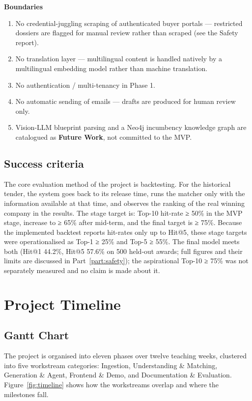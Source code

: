 \textbf{Boundaries}

\begin{enumerate}
\tightlist
\item No credential-juggling scraping of authenticated buyer portals --- restricted
  dossiers are flagged for manual review rather than scraped (see the Safety report).
\item No translation layer --- multilingual content is handled natively by a
  multilingual embedding model rather than machine translation.
\item No authentication / multi-tenancy in Phase 1.
\item No automatic sending of emails --- drafts are produced for human review only.
\item Vision-LLM blueprint parsing and a Neo4j incumbency knowledge graph are
  catalogued as \textbf{Future Work}, not committed to the MVP.
\end{enumerate}

\subsection{Success criteria}
The core evaluation method of the project is backtesting. For the historical tender,
the system goes back to its release time, runs the matcher only with the information
available at that time, and observes the ranking of the real winning company in the
results. The stage target is: Top-10 hit-rate ≥ 50\% in the MVP stage, increase to
≥ 65\% after mid-term, and the final target is ≥ 75\%. Because the implemented
backtest reports hit-rates only up to Hit@5, these stage targets were operationalised
as Top-1 ≥ 25\% and Top-5 ≥ 55\%. The final model meets both (Hit@1 44.2\%,
Hit@5 57.6\% on 500 held-out awards; full figures and their limits are discussed in
Part~\ref{part:safety}); the aspirational Top-10 ≥ 75\% was not separately measured
and no claim is made about it.

\section{Project Timeline}

\subsection{Gantt Chart}

The project is organised into eleven phases over twelve teaching weeks, clustered
into five workstream categories: Ingestion, Understanding \& Matching, Generation \&
Agent, Frontend \& Demo, and Documentation \& Evaluation. Figure~\ref{fig:timeline}
shows how the workstreams overlap and where the milestones fall.


